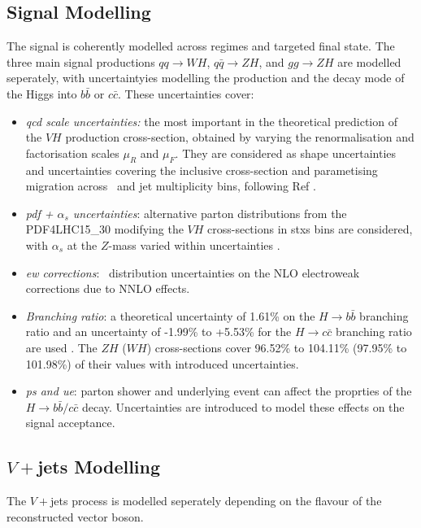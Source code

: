   \subsection{Signal Modelling}\label{sec-modSignal}
  The signal is coherently modelled across regimes and targeted final state. The three main signal productions $qq \rightarrow WH$, $q\bar{q} \rightarrow ZH$, and $gg \rightarrow ZH$ are modelled seperately, with uncertaintyies modelling the production and the decay mode of the Higgs into $b\bar{b}$ or $c\bar{c}$. These uncertainties cover:
  \begin{itemize}
    \item \textit{\gls{qcd} scale uncertainties:} the most important in the theoretical prediction of the $VH$ production cross-section, obtained by varying the renormalisation and factorisation scales $\mu_R$ and $\mu_F$. They are considered as shape uncertainties and uncertainties covering the inclusive cross-section and parametising migration across \ptv\ and jet multiplicity bins, following Ref \cite{ATL-PHYS-PUB-2018-035}.
    \item \textit{\gls{pdf} + $\alpha_s$ uncertainties}: alternative parton distributions from the \textsc{PDF4LHC15\_30} modifying the $VH$ cross-sections in \gls{stxs} bins are considered, with $\alpha_s$ at the $Z$-mass varied within uncertainties \cite{Butterworth:2015oua}.
    \item \textit{\gls{ew} corrections}: \ptv\ distribution uncertainties on the NLO electroweak corrections due to NNLO effects. 
    \item \textit{Branching ratio}: a theoretical uncertainty of 1.61\% on the $H \rightarrow{b\bar{b}}$ branching ratio and an uncertainty of -1.99\% to +5.53\% for the $H \rightarrow{c\bar{c}}$ branching ratio are used \cite{LHCHiggsCrossSectionWorkingGroup:2016ypw}. The $ZH$ ($WH$) cross-sections cover 96.52\% to 104.11\% (97.95\% to 101.98\%) of their values with introduced uncertainties.
    \item \textit{\gls{ps} and \gls{ue}}: parton shower and underlying event can affect the proprties of the $H \rightarrow b\bar{b} / c\bar{c}$ decay. Uncertainties are introduced to model these effects on the signal acceptance.
\end{itemize}

\subsection{$V+$jets Modelling}\label{sec-modVjet} %
The $V+$jets process is modelled seperately depending on the flavour of the reconstructed vector boson. 

